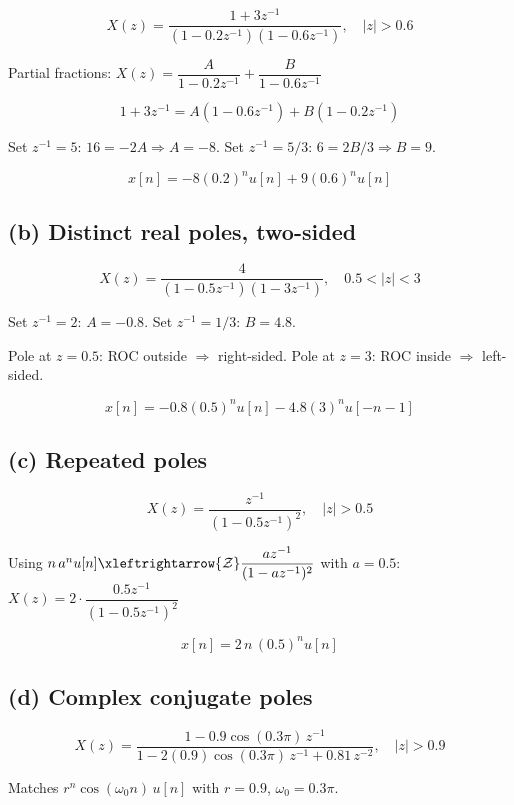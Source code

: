 \documentclass[11pt]{article}
\newcommand{\zt}{\xleftrightarrow{\mathcal{Z}}}
\begin{document}
\[
X(z) = \frac{1 + 3z^{-1}}{(1 - 0.2z^{-1})(1 - 0.6z^{-1})}, \quad |z| > 0.6
\]

Partial fractions: $X(z) = \dfrac{A}{1 - 0.2z^{-1}} + \dfrac{B}{1 - 0.6z^{-1}}$

\[
1 + 3z^{-1} = A(1 - 0.6z^{-1}) + B(1 - 0.2z^{-1})
\]

Set $z^{-1} = 5$: $16 = -2A \Rightarrow A = -8$. \quad Set $z^{-1} = 5/3$: $6 = 2B/3 \Rightarrow B = 9$.

\begin{equation*}
\boxed{x[n] = -8(0.2)^n u[n] + 9(0.6)^n u[n]}
\end{equation*}

\subsection*{(b) Distinct real poles, two-sided}

\[
X(z) = \frac{4}{(1 - 0.5z^{-1})(1 - 3z^{-1})}, \quad 0.5 < |z| < 3
\]

Set $z^{-1} = 2$: $A = -0.8$. \quad Set $z^{-1} = 1/3$: $B = 4.8$.

Pole at $z=0.5$: ROC outside $\Rightarrow$ right-sided. Pole at $z=3$: ROC inside $\Rightarrow$ left-sided.

\begin{equation*}
\boxed{x[n] = -0.8(0.5)^n u[n] - 4.8(3)^n u[-n-1]}
\end{equation*}

\subsection*{(c) Repeated poles}

\[
X(z) = \frac{z^{-1}}{(1 - 0.5z^{-1})^2}, \quad |z| > 0.5
\]

Using $n\,a^n u[n] \zt \dfrac{az^{-1}}{(1-az^{-1})^2}$ with $a=0.5$: $X(z) = 2 \cdot \dfrac{0.5z^{-1}}{(1-0.5z^{-1})^2}$

\begin{equation*}
\boxed{x[n] = 2\,n\,(0.5)^n u[n]}
\end{equation*}

\subsection*{(d) Complex conjugate poles}

\[
X(z) = \frac{1 - 0.9\cos(0.3\pi)\,z^{-1}}{1 - 2(0.9)\cos(0.3\pi)\,z^{-1} + 0.81\,z^{-2}}, \quad |z| > 0.9
\]

Matches $r^n\cos(\omega_0 n)\,u[n]$ with $r = 0.9$, $\omega_0 = 0.3\pi$.
\end{document}
